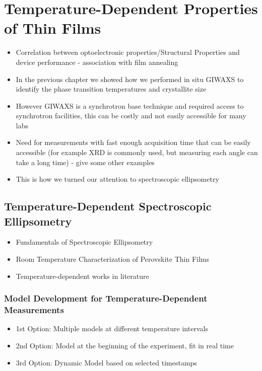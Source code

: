 \chapter{Temperature-Dependent Properties of  Thin Films}\label{ch:ellipsometry}


\begin{itemize}
    \item Correlation between optoelectronic properties/Structural Properties and device performance - association with film annealing
    \item In the previous chapter we showed how we performed in situ GIWAXS to identify the phase transition temperatures and crystallite size 
    \item However GIWAXS is a synchrotron base technique and required access to synchrotron facilities, this can be costly and not easily accessible for many labs
    \item Need for measurements with fast enough acquisition time that can be easily accessible (for example XRD is commonly used, but measuring each angle can take a long time) - give some other examples 
    \item This is how we turned our attention to spectroscopic ellipsometry

\end{itemize}

\section{Temperature-Dependent Spectroscopic Ellipsometry}

\begin{itemize}
    \item Fundamentals of Spectroscopic Ellipsometry
    \item Room Temperature Characterization of Perovskite Thin Films
    \item Temperature-dependent works in literature
\end{itemize}

\subsection{Model Development for Temperature-Dependent Measurements}

\begin{itemize}
    \item 1st Option: Multiple models at different temperature intervals
    \item 2nd Option: Model at the beginning of the experiment, fit in real time
    \item 3rd Option: Dynamic Model based on selected timestamps
\end{itemize}

